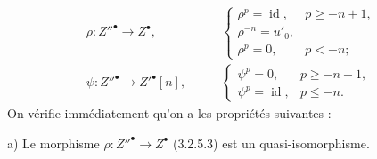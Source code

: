 \begin{equation}
\begin{aligned}
\rho\colon Z''^\bullet\longrightarrow Z^\bullet,
&\qquad
\begin{cases}
\rho^p=\operatorname{id},&p\geq -n+1,\\
\rho^{-n}=u'_0,&\\
\rho^p=0,&p<-n;
\end{cases}\\[3pt]
\psi\colon Z''^\bullet\longrightarrow {Z'}^\bullet[n],
&\qquad
\begin{cases}
\psi^p=0,&p\geq -n+1,\\
\psi^p=\operatorname{id},&p\leq -n.
\end{cases}
\end{aligned}
\tag{3.2.5.3}
\end{equation}
On vérifie immédiatement qu'on a les propriétés suivantes :

\noindent a) Le morphisme
$\rho\colon Z''^\bullet\longrightarrow Z^\bullet$ (3.2.5.3) est un
quasi-isomorphisme.
\endgroup
